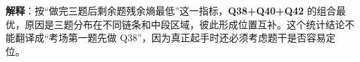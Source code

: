 \textbf{解释}：按“做完三题后剩余题残余熵最低”这一指标，\textbf{Q38+Q40+Q42} 的组合最优，原因是三题分布在不同链条和中段区域，彼此形成位置互补。这个统计结论不能翻译成“考场第一题先做 Q38”，因为真正起手时还必须考虑题干是否容易定位。